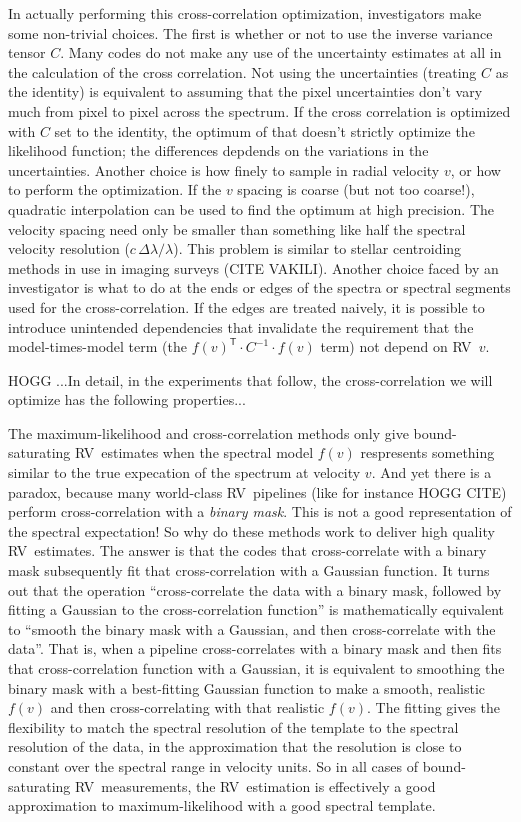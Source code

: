 \documentclass[modern]{aastex62}
\newcommand{\T}{^{\mathsf{T}}}
\newcommand{\acronym}[1]{{\small{#1}}}
\newcommand{\RV}{\acronym{RV}}
\begin{document}
In actually performing this cross-correlation optimization,
investigators make some non-trivial choices.
The first is whether or not to use the inverse variance tensor $C$.
Many codes do not make any use of the uncertainty estimates at all in
the calculation of the cross correlation.
Not using the uncertainties (treating $C$ as the identity) is
equivalent to assuming that the pixel uncertainties don't vary much
from pixel to pixel across the spectrum.
If the cross correlation is optimized with $C$ set to the identity,
the optimum of that doesn't strictly optimize the likelihood function;
the differences depdends on the variations in the uncertainties.
Another choice is how finely to sample in radial velocity $v$, or how
to perform the optimization.
If the $v$ spacing is coarse (but not too coarse!), quadratic
interpolation can be used to find the optimum at high precision.
The velocity spacing need only be smaller than something like half the
spectral velocity resolution ($c\,\Delta\lambda / \lambda$).
This problem is similar to stellar centroiding methods in use in
imaging surveys (CITE VAKILI).
Another choice faced by an investigator is what to do at the ends or
edges of the spectra or spectral segments used for the
cross-correlation.
If the edges are treated naively, it is possible to introduce unintended
dependencies that invalidate the requirement that the model-times-model term
(the $f(v)\T\cdot C^{-1}\cdot f(v)$ term) not depend on \RV\ $v$.

HOGG ...In detail, in the experiments that follow, the
cross-correlation we will optimize has the following properties...

The maximum-likelihood and cross-correlation methods only give
bound-saturating \RV\ estimates when the spectral model $f(v)$
respresents something similar to the true expecation of the spectrum
at velocity $v$.
And yet there is a paradox, because many world-class \RV\ pipelines
(like for instance HOGG CITE) perform cross-correlation with a
\emph{binary mask}.
This is not a good representation of the spectral expectation! So why
do these methods work to deliver high quality \RV\ estimates.
The answer is that the codes that cross-correlate with a binary mask
subsequently fit that cross-correlation with a Gaussian function.
It turns out that the operation ``cross-correlate the data with a
binary mask, followed by fitting a Gaussian to the cross-correlation
function'' is mathematically equivalent to ``smooth the binary mask
with a Gaussian, and then cross-correlate with the data''.
That is, when a pipeline cross-correlates with a binary mask and then
fits that cross-correlation function with a Gaussian, it is equivalent
to smoothing the binary mask with a best-fitting Gaussian function to
make a smooth, realistic $f(v)$ and then cross-correlating with that
realistic $f(v)$.
The fitting gives the flexibility to match the spectral resolution of
the template to the spectral resolution of the data, in the
approximation that the resolution is close to constant over the
spectral range in velocity units.
So in all cases of bound-saturating \RV\ measurements, the
\RV\ estimation is effectively a good approximation to
maximum-likelihood with a good spectral template.
\end{document}

